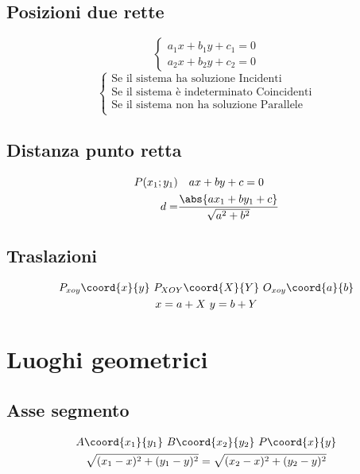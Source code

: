 \section{Posizioni due rette}
\begin{equation}
\begin{cases}
a_1x+b_1y+c_1=0\\
a_2x+b_2y+c_2=0
\end{cases}
\end{equation}
\begin{equation}
\begin{cases}
\text{Se il sistema ha soluzione Incidenti}\\
\text{Se il sistema è indeterminato Coincidenti}\\
\text{Se il sistema non ha soluzione Parallele}\\
\end{cases}
\end{equation}
\section{Distanza punto retta}
\begin{align}
P(x_1;y_1)&\quad ax+by+c=0\\
d=&\dfrac{\abs{ax_1+by_1+c}}{\sqrt{a^2+b^2}}
\end{align}
\section{Traslazioni}
\begin{gather}
 P_{xoy}\coord{x}{y}\ P_{XOY}\coord{X}{Y}\ O_{xoy}\coord{a}{b}\notag\\  x=a+X\  y=b+Y
\end{gather}
\chapter{Luoghi geometrici}
\section{Asse segmento}
\begin{gather}
A\coord{x_1}{y_1}\ B\coord{x_2}{y_2}\ P\coord{x}{y}\notag\\
\sqrt{(x_1-x)^2+(y_1-y)^2}=\sqrt{(x_2-x)^2+(y_2-y)^2}
\end{gather}
